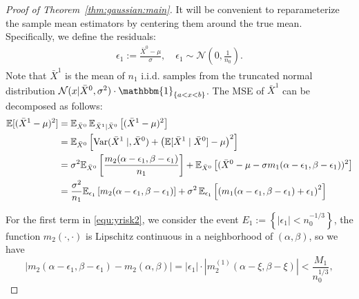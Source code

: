 \begin{proof}[Proof of Theorem~\ref{thm:gaussian:main}]

It will be convenient to reparameterize the sample mean estimators by centering them around the true mean. Specifically, we define the residuals:
\begin{align}
    \epsilon_1 := \frac{\bar{X}^{0}-\mu}{\sigma}, \quad \epsilon_1 \sim \mathcal{N}(0, \frac{1}{n_0}). \label{equ:epsilon}
\end{align}
Note that \(\bar{X}^{1}\) is the mean of \(n_1\) i.i.d. samples from the truncated normal distribution \(\mathcal{N}(x|\bar{X}^0,\sigma^2)\cdot \mathbbm{1}_{\{a<x<b\}}\). 
The MSE of \( \bar{X}^1 \) can be decomposed as follows:
\begin{align}
\mathbb{E}[(\bar{X}^1 - \mu)^2] 
&= \mathbb{E}_{\bar{X}^{0}} \, \mathbb{E}_{\bar{X}^1 \mid\bar{X}^{0}} \left[(\bar{X}^1 - \mu)^2\right] \notag \\
&= \mathbb{E}_{\bar{X}^{0}} \left[ \operatorname{Var}(\bar{X}^1 \mid, \bar{X}^{0}) + \left( \mathbb{E}[\bar{X}^1 \mid \bar{X}^{0}] - \mu \right)^2 \right] \notag \\
&= \sigma^2 \mathbb{E}_{\bar{X}^{0}} \left[   \frac{m_2(\alpha-\epsilon_1, \beta-\epsilon_1)}{n_1}  \right] + \mathbb{E}_{\bar{X}^{0}} \left[ (\bar{X}^{0} - \mu - \sigma m_1(\alpha-\epsilon_1, \beta-\epsilon_1))^2 \right] \notag \\
&= \frac{\sigma^2}{n_1} \mathbb{E}_{\epsilon_1}\left[m_2(\alpha-\epsilon_1, \beta-\epsilon_1)\right] + \sigma^2 \, \mathbb{E}_{\epsilon_1} \left[ \left(m_1(\alpha - \epsilon_1, \beta - \epsilon_1) + \epsilon_1 \right)^2 \right] \label{equ:yrisk2}
\end{align}
       
For the first term in \ref{equ:yrisk2}, we consider the event \( E_1 := \left\{ |\epsilon_1| < n_0^{-1/3} \right\} \), the function \( m_2(\cdot, \cdot) \) is Lipschitz continuous in a neighborhood of \( (\alpha, \beta) \), so we have
\begin{equation}\label{equ:first}
    \left| m_2(\alpha - \epsilon_1, \beta - \epsilon_1) - m_2(\alpha, \beta) \right| 
    = |\epsilon_1| \cdot \left| m_2^{(1)}(\alpha - \xi, \beta - \xi) \right| 
    < \frac{M_1}{n_0^{1/3}},
\end{equation}
  

\end{proof}
